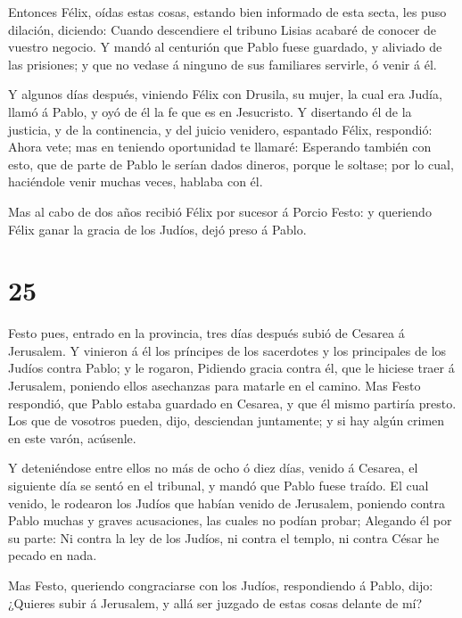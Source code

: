  Entonces Félix, oídas estas cosas, estando bien informado
de esta secta, les puso dilación, diciendo: Cuando descendiere el
tribuno Lisias acabaré de conocer de vuestro negocio.  Y
mandó al centurión que Pablo fuese guardado, y aliviado de las
prisiones; y que no vedase á ninguno de sus familiares servirle, ó venir
á él.

 Y algunos días después, viniendo Félix con Drusila, su
mujer, la cual era Judía, llamó á Pablo, y oyó de él la fe que es en
Jesucristo.  Y disertando él de la justicia, y de la
continencia, y del juicio venidero, espantado Félix, respondió: Ahora
vete; mas en teniendo oportunidad te llamaré:  Esperando
también con esto, que de parte de Pablo le serían dados dineros, porque
le soltase; por lo cual, haciéndole venir muchas veces, hablaba con él.

 Mas al cabo de dos años recibió Félix por sucesor á Porcio
Festo: y queriendo Félix ganar la gracia de los Judíos, dejó preso á
Pablo.

\hypertarget{section-24}{%
\section{25}\label{section-24}}

 Festo pues, entrado en la provincia, tres días después
subió de Cesarea á Jerusalem.  Y vinieron á él los príncipes
de los sacerdotes y los principales de los Judíos contra Pablo; y le
rogaron,  Pidiendo gracia contra él, que le hiciese traer á
Jerusalem, poniendo ellos asechanzas para matarle en el camino.
 Mas Festo respondió, que Pablo estaba guardado en Cesarea,
y que él mismo partiría presto.  Los que de vosotros pueden,
dijo, desciendan juntamente; y si hay algún crimen en este varón,
acúsenle.

 Y deteniéndose entre ellos no más de ocho ó diez días,
venido á Cesarea, el siguiente día se sentó en el tribunal, y mandó que
Pablo fuese traído.  El cual venido, le rodearon los Judíos
que habían venido de Jerusalem, poniendo contra Pablo muchas y graves
acusaciones, las cuales no podían probar;  Alegando él por
su parte: Ni contra la ley de los Judíos, ni contra el templo, ni contra
César he pecado en nada.

 Mas Festo, queriendo congraciarse con los Judíos,
respondiendo á Pablo, dijo: ¿Quieres subir á Jerusalem, y allá ser
juzgado de estas cosas delante de mí?

